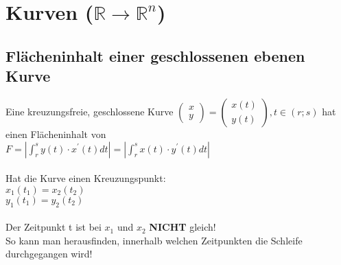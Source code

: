 \section{Kurven ($\mathbb{R} \rightarrow \mathbb{R}^n$)}


\subsection{Flächeninhalt einer geschlossenen ebenen Kurve}
  Eine kreuzungsfreie, geschlossene Kurve $\begin{pmatrix} x\\ y \end{pmatrix} = \begin{pmatrix} x(t)\\ y(t) \end{pmatrix}, t \in (r;s)$ 
  hat einen Flächeninhalt von\\
  $\boxed{F =  \left | \int_r^s y(t) \cdot x^{'}(t) dt \right | = \left | \int_r^s
  x(t) \cdot y^{'}(t) dt \right |}$\\\\
  Hat die Kurve einen Kreuzungspunkt:\\ 
  $x_1(t_1) = x_2(t_2)$\\
  $y_1(t_1) = y_2(t_2)$\\\\
  Der Zeitpunkt t ist bei $x_1$ und $x_2$ \textbf{NICHT} gleich!\\
  So kann man herausfinden, innerhalb welchen Zeitpunkten die Schleife durchgegangen wird!\\

